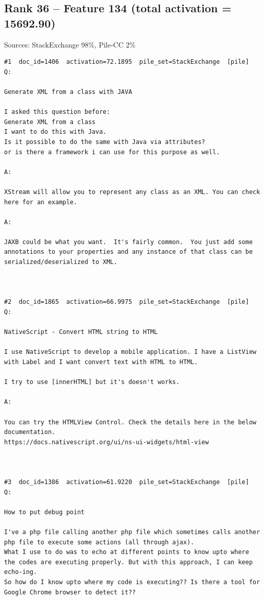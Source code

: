 \subsection*{Rank 36 -- Feature 134 (total activation = 15692.90)}

Sources: StackExchange 98\%, Pile-CC 2\%

\begin{verbatim}
#1  doc_id=1406  activation=72.1895  pile_set=StackExchange  [pile]
Q:

Generate XML from a class with JAVA

I asked this question before:
Generate XML from a class
I want to do this with Java.
Is it possible to do the same with Java via attributes?
or is there a framework i can use for this purpose as well.

A:

XStream will allow you to represent any class as an XML. You can check here for an example.

A:

JAXB could be what you want.  It's fairly common.  You just add some annotations to your properties and any instance of that class can be serialized/deserialized to XML.



#2  doc_id=1865  activation=66.9975  pile_set=StackExchange  [pile]
Q:

NativeScript - Convert HTML string to HTML

I use NativeScript to develop a mobile application. I have a ListView with Label and I want convert text with HTML to HTML.

I try to use [innerHTML] but it's doesn't works.

A:

You can try the HTMLView Control. Check the details here in the below documentation.
https://docs.nativescript.org/ui/ns-ui-widgets/html-view



#3  doc_id=1386  activation=61.9220  pile_set=StackExchange  [pile]
Q:

How to put debug point

I've a php file calling another php file which sometimes calls another php file to execute some actions (all through ajax).
What I use to do was to echo at different points to know upto where the codes are executing properly. But with this approach, I can keep echo-ing.
So how do I know upto where my code is executing?? Is there a tool for Google Chrome browser to detect it??


\end{verbatim}

